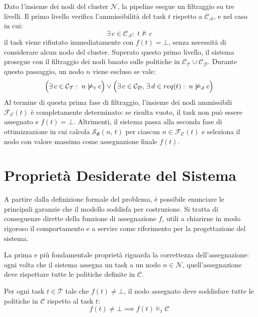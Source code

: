 Dato l'insieme dei nodi del cluster $\mathcal{N}$, la pipeline esegue un filtraggio su tre livelli. Il primo livello verifica l'ammissibilità del task $t$ rispetto a $\mathcal{C_A}$, e nel caso in cui:
\begin{equation}
    \exists\, c \in \mathcal{C_A} :\; t \not\models c
\end{equation}
il task viene rifiutato immediatamente con $f(t) = \bot$, senza necessità di considerare alcun nodo del cluster. Superato questo primo livello, il sistema prosegue con il filtraggio dei nodi basato sulle politiche in $\mathcal{C_T} \cup \mathcal{C_D}$. Durante questo passaggio, un nodo $n$ viene escluso se vale:
\begin{equation} 
    \Bigl( \exists\, c \in \mathcal{C_T} :\; n \not\models_t c \Bigr) 
    \lor 
    \Bigl( \exists\, c \in \mathcal{C_D},\, \exists\, d \in req(t) :\; n \not\models_d c \Bigr) 
\end{equation}
Al termine di questa prima fase di filtraggio, l'insieme dei nodi ammissibili $\mathcal{F_C}(t)$ è completamente determinato: se risulta vuoto, il task non può essere assegnato e $f(t) = \bot$. Altrimenti, il sistema passa alla seconda fase di ottimizzazione in cui calcola $\mathcal{S}_\Phi(n,\, t)$ per ciascun $n \in \mathcal{F_C}(t)$ e seleziona il nodo con valore massimo come assegnazione finale $f(t)$.


\section{Proprietà Desiderate del Sistema}
\label{sec:proprieta_desiderate}

A partire dalla definizione formale del problema, è possibile enunciare le principali garanzie che il modello soddisfa per costruzione. Si tratta di conseguenze dirette della funzione di assegnazione $f$, utili a chiarirne in modo rigoroso il comportamento e a servire come riferimento per la progettazione del sistema.

La prima e più fondamentale proprietà riguarda la correttezza dell'assegnazione: ogni volta che il sistema assegna un task a un nodo $n \in \mathcal{N}$, quell'assegnazione deve rispettare tutte le politiche definite in $\mathcal{C}$.

\begin{property}[Correttezza] 
    \label{prop:correttezza}
    Per ogni task $t \in \mathcal{T}$ tale che $f(t) \neq \bot$, il nodo assegnato deve soddisfare tutte le politiche in $\mathcal{C}$ rispetto al task $t$:
    \begin{equation}
        f(t) \neq \bot \implies f(t) \models_t \mathcal{C}
    \end{equation}
\end{property}

